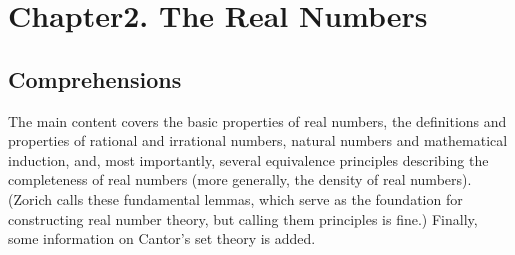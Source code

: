 

%


\newpage
\section{Chapter2. The Real Numbers}
\subsection{Comprehensions}
The main content covers the basic properties of real numbers, the definitions and properties of 
rational and irrational numbers, natural numbers and mathematical induction, and, most importantly, 
several equivalence principles describing the completeness of real numbers (more generally, the density of 
real numbers). (Zorich calls these fundamental lemmas, which serve as the foundation for constructing 
real number theory, but calling them principles is fine.) Finally, some information on Cantor's set theory is added.

